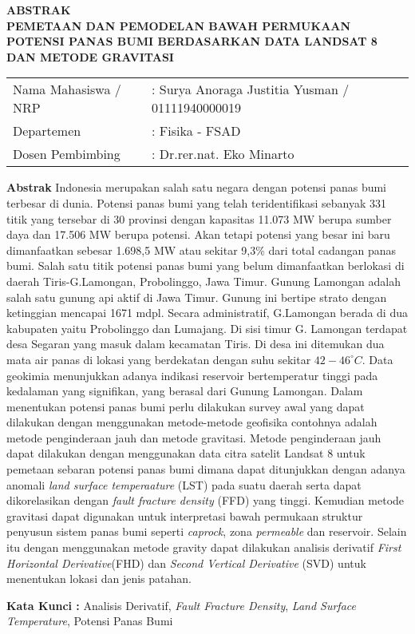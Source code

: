 \newpage
\thispagestyle{empty}

\begin{center}
	\textbf{ABSTRAK}\\
	\vskip 20pt
	\textbf{PEMETAAN DAN PEMODELAN BAWAH PERMUKAAN POTENSI PANAS BUMI BERDASARKAN DATA LANDSAT 8 DAN METODE GRAVITASI}
	\vskip 20pt
\end{center}

\begin{table}[h]
	\begin{tabular}{ll}
		Nama Mahasiswa / NRP &: Surya Anoraga Justitia Yusman / 01111940000019\\
		Departemen &: Fisika - FSAD\\
		Dosen Pembimbing &: Dr.rer.nat. Eko Minarto
	\end{tabular}
\end{table}

\vskip 10pt
\textbf{Abstrak}
\vskip 5pt
\hspace{25pt} Indonesia merupakan salah satu negara dengan potensi panas bumi terbesar di dunia. Potensi panas bumi yang telah teridentifikasi sebanyak 331 titik yang tersebar di 30 provinsi dengan kapasitas 11.073 MW berupa sumber daya dan 17.506 MW berupa potensi. Akan tetapi potensi yang besar ini baru dimanfaatkan sebesar 1.698,5 MW atau sekitar 9,3\% dari total cadangan panas bumi. Salah satu titik potensi panas bumi yang belum dimanfaatkan berlokasi di daerah Tiris-G.Lamongan, Probolinggo, Jawa Timur. Gunung Lamongan adalah salah satu gunung api aktif di Jawa Timur. Gunung ini bertipe strato dengan ketinggian mencapai 1671 mdpl. Secara administratif, G.Lamongan berada di dua kabupaten yaitu Probolinggo dan Lumajang. Di sisi timur G. Lamongan terdapat desa Segaran yang masuk dalam kecamatan Tiris. Di desa ini ditemukan dua mata air panas di lokasi yang berdekatan dengan suhu sekitar $42-46^{\circ}C$. Data geokimia menunjukkan adanya indikasi reservoir bertemperatur tinggi pada kedalaman yang signifikan, yang berasal dari Gunung Lamongan. Dalam menentukan potensi panas bumi perlu dilakukan survey awal yang dapat dilakukan dengan menggunakan metode-metode geofisika contohnya adalah metode penginderaan jauh dan metode gravitasi. Metode penginderaan jauh dapat dilakukan dengan menggunakan data citra satelit Landsat 8 untuk pemetaan sebaran potensi panas bumi dimana dapat ditunjukkan dengan adanya anomali \textit{land surface temperaature} (LST) pada suatu daerah serta dapat dikorelasikan dengan \textit{fault fracture density} (FFD) yang tinggi. Kemudian metode gravitasi dapat digunakan untuk interpretasi bawah permukaan struktur penyusun sistem panas bumi seperti \textit{caprock}, zona \textit{permeable} dan reservoir. Selain itu dengan menggunakan metode gravity dapat dilakukan analisis derivatif \textit{First Horizontal Derivative}(FHD) dan \textit{Second Vertical Derivative }(SVD) untuk menentukan lokasi dan jenis patahan.

\vskip 10pt
\textbf{Kata Kunci :} Analisis Derivatif, \textit{Fault Fracture Density}, \textit{Land Surface Temperature}, Potensi Panas Bumi 

\restoregeometry
